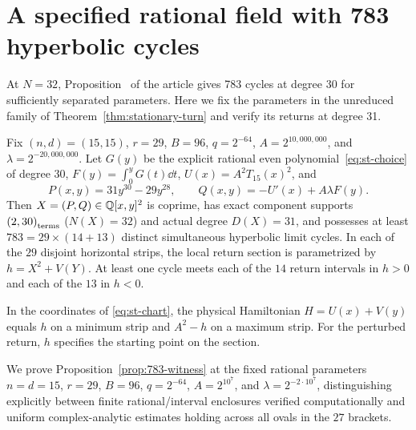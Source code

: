 \section{A specified rational field with 783 hyperbolic cycles}\label{app:783-proof}
At \(N=32\), Proposition~ of the article gives 783 cycles at degree 30 for sufficiently separated parameters. Here we fix the parameters in the unreduced family of Theorem~\ref{thm:stationary-turn} and verify its returns at degree 31.

\begin{proposition}\label{prop:783-witness}
Fix $(n,d)=(15,15)$, $r=29$, $B=96$, $q=2^{-64}$, $A=2^{10{,}000{,}000}$, and $\lambda=2^{-20{,}000{,}000}$. Let $G(y)$ be the explicit rational even polynomial~\eqref{eq:st-choice} of degree $30$, $F(y)=\int_0^y G(t)\dd t$, $U(x)=A^2 T_{15}(x)^2$, and
\[
  P(x,y) = 31y^{30} - 29y^{28}, \qquad
  Q(x,y) = -U'(x) + A\lambda F(y).
\]
Then $X=(P,Q)\in\mathbb{Q}[x,y]^2$ is coprime, has exact component supports $\left(2,30\right)_{\mathrm{terms}}$ ($N(X)=32$) and actual degree $D(X)=31$, and possesses at least $783=29\times(14+13)$ distinct simultaneous hyperbolic limit cycles. In each of the $29$ disjoint horizontal strips, the local return section is parametrized by $h=X^2+V(Y)$. At least one cycle meets each of the $14$ return intervals in $h>0$ and each of the $13$ in $h<0$.
\end{proposition}

In the coordinates of \eqref{eq:st-chart}, the physical Hamiltonian \(H=U(x)+V(y)\) equals \(h\) on a minimum strip and \(A^2-h\) on a maximum strip. For the perturbed return, \(h\) specifies the starting point on the section.

We prove Proposition~\ref{prop:783-witness} at the fixed rational parameters $n=d=15$, $r=29$, $B=96$, $q=2^{-64}$, $A=2^{10^7}$, and $\lambda=2^{-2\cdot 10^7}$, distinguishing explicitly between finite rational/interval enclosures verified computationally and uniform complex-analytic estimates holding across all ovals in the $27$ brackets.

